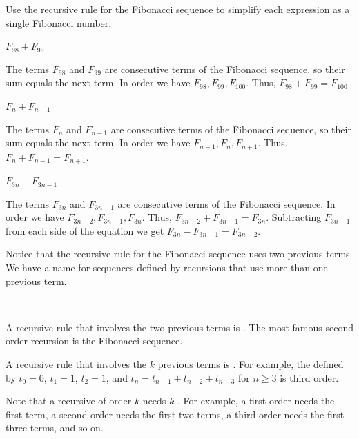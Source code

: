 \begin{exam}
\label{exam_write_as_fib}
    Use the recursive rule for the Fibonacci sequence to simplify each expression as a single Fibonacci number.  
        \begin{apart}
            \item $F_{98} + F_{99}$     
                \begin{soln}
                    The terms $F_{98}$ and $F_{99}$ are consecutive terms of the Fibonacci sequence, so their sum equals the next term. In order we have  $F_{98}, F_{99}, F_{100}$. Thus, $F_{98} + F_{99}=F_{100}$.
                \end{soln}
            \item $F_n+F_{n-1}$
                \begin{soln}
                    The terms $F_n$ and $F_{n-1}$ are consecutive terms of the Fibonacci sequence, so their sum equals the next term.  In order we have $F_{n-1}, F_n, F_{n+1}$. Thus, $F_n+F_{n-1}=F_{n+1}$.  
                \end{soln}
            \item $F_{3n} - F_{3n-1}$
                \begin{soln}
                    The terms $F_{3n}$ and $F_{3n-1}$ are consecutive terms of the Fibonacci sequence. In order we have $F_{3n-2}, F_{3n-1}, F_{3n}$. Thus, $F_{3n-2} + F_{3n-1} = F_{3n}$.  Subtracting $F_{3n-1}$ from each side of the equation we get  $F_{3n} - F_{3n-1}= F_{3n-2}$.
                \end{soln}
        \end{apart}
\end{exam}

Notice that the recursive rule for the Fibonacci sequence uses two previous terms.  We have a name for sequences defined by recursions that use more than one previous term.

\begin{defn}
\label{defn_higher_order_rec}
~
    \begin{apart}
        \item A recursive rule that involves the two previous terms is .  The most famous second order recursion is the Fibonacci sequence. 
        
        \item A recursive rule that involves the $k$ previous terms is .  For example, the  defined by $t_0=0$, $t_1=1$, $t_2=1$, and $t_n=t_{n-1}+t_{n-2}+t_{n-3}$ for $n\ge 3$ is third order.
        
        \item Note that a recursive of order $k$ needs $k$ .  For example, a first order needs the first term, a second order needs the first two terms, a third order needs the first three terms, and so on.
    \end{apart}
\end{defn}

